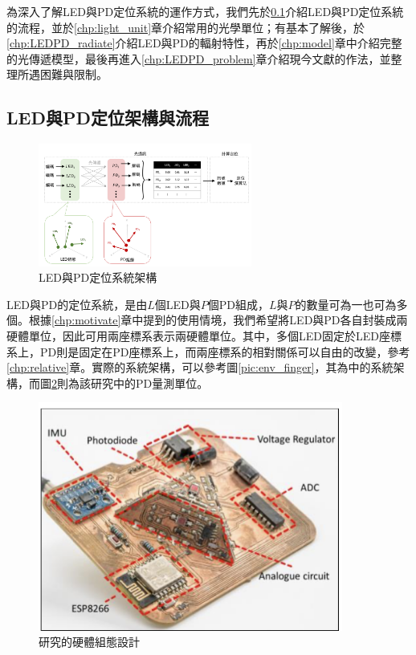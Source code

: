     為深入了解LED與PD定位系統的運作方式，我們先於\ref{chp:LEDPD_flow}介紹LED與PD定位系統的流程，並於\ref{chp:light_unit}章介紹常用的光學單位；有基本了解後，於\ref{chp:LEDPD_radiate}介紹LED與PD的輻射特性，再於\ref{chp:model}章中介紹完整的光傳遞模型，最後再進入\ref{chp:LEDPD_problem}章介紹現今文獻的作法，並整理所遇困難與限制。

    \subsection{LED與PD定位架構與流程}
    \label{chp:LEDPD_flow}

    \begin{figure}[h]
        \centering
        \includegraphics[width=7cm]{ch2pic/lp_system_structure.png}
        \caption{LED與PD定位系統架構}
        \label{pic:lp_system_structure}
    \end{figure}

    LED與PD的定位系統，是由$L$個LED與$P$個PD組成，$L$與$P$的數量可為一也可為多個。根據\ref{chp:motivate}章中提到的使用情境，我們希望將LED與PD各自封裝成兩硬體單位，因此可用兩座標系表示兩硬體單位。其中，多個LED固定於LED座標系上，PD則是固定在PD座標系上，而兩座標系的相對關係可以自由的改變，參考\ref{chp:relative}章。實際的系統架構，可以參考圖\ref{pic:env_finger}，其為\cite{case:ml}中的系統架構，而圖\ref{pic:ml_pd_config}則為該研究中的PD量測單位。

    \begin{figure}[h]
        \centering
        \includegraphics[width=10cm]{ch2pic/ml_pd_config.png}
        \caption{\cite{case:ml}研究的硬體組態設計}
        \label{pic:ml_pd_config}
    \end{figure}

